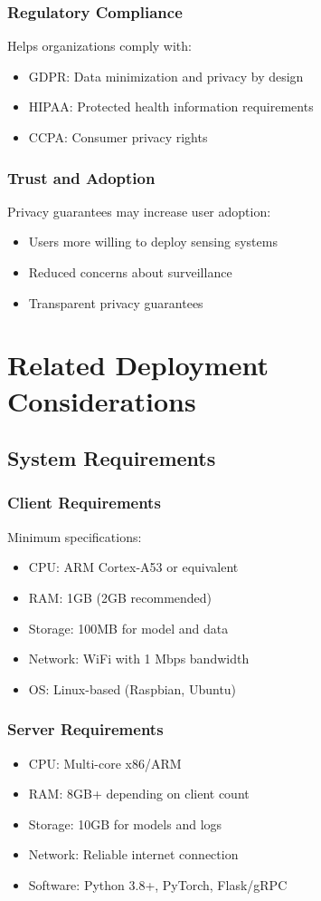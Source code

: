 \documentclass[journal]{IEEEtran}
\begin{document}
\subsubsection{Regulatory Compliance}
Helps organizations comply with:
\begin{itemize}
\item GDPR: Data minimization and privacy by design
\item HIPAA: Protected health information requirements
\item CCPA: Consumer privacy rights
\end{itemize}

\subsubsection{Trust and Adoption}
Privacy guarantees may increase user adoption:
\begin{itemize}
\item Users more willing to deploy sensing systems
\item Reduced concerns about surveillance
\item Transparent privacy guarantees
\end{itemize}

\section{Related Deployment Considerations}

\subsection{System Requirements}

\subsubsection{Client Requirements}
Minimum specifications:
\begin{itemize}
\item CPU: ARM Cortex-A53 or equivalent
\item RAM: 1GB (2GB recommended)
\item Storage: 100MB for model and data
\item Network: WiFi with 1 Mbps bandwidth
\item OS: Linux-based (Raspbian, Ubuntu)
\end{itemize}

\subsubsection{Server Requirements}
\begin{itemize}
\item CPU: Multi-core x86/ARM
\item RAM: 8GB+ depending on client count
\item Storage: 10GB for models and logs
\item Network: Reliable internet connection
\item Software: Python 3.8+, PyTorch, Flask/gRPC
\end{itemize}
\end{document}
